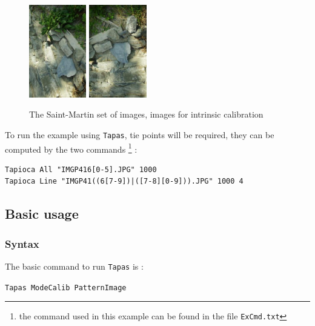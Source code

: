 \begin{figure}[H]
\begin{center}
\includegraphics[width=25mm]{FIGS/MurSaintMartin/Small-IMGP4164.JPG}
\includegraphics[width=25mm]{FIGS/MurSaintMartin/Small-IMGP4165.JPG}
\end{center}
\caption{The Saint-Martin set of images, images for intrinsic calibration}
\label{FIG:StM:Calib}
\end{figure}

To run the example using {\tt Tapas}, tie points will be required, they can
be computed by the two  commands \footnote{the command used in this example can be found in
the file {\tt ExCmd.txt}} :


\begin{verbatim}
Tapioca All "IMGP416[0-5].JPG" 1000
Tapioca Line "IMGP41((6[7-9])|([7-8][0-9])).JPG" 1000 4
\end{verbatim}


\subsection{Basic usage}


\label{Basi:Tapas}

\subsubsection{Syntax}

The basic command to run  {\tt Tapas} is :

\begin{center}
   {\tt Tapas  ModeCalib  PatternImage}
\end{center}

